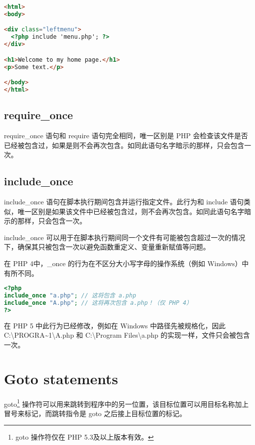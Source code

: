 \begin{lstlisting}[language=HTML]
<html>
<body>

<div class="leftmenu">
  <?php include 'menu.php'; ?>
</div>

<h1>Welcome to my home page.</h1>
<p>Some text.</p>

</body>
</html>
\end{lstlisting}


\subsection{require\_once}

require\_once 语句和 require 语句完全相同，唯一区别是 PHP 会检查该文件是否已经被包含过，如果是则不会再次包含。如同此语句名字暗示的那样，只会包含一次。

\subsection{include\_once}

include\_once 语句在脚本执行期间包含并运行指定文件。此行为和 include 语句类似，唯一区别是如果该文件中已经被包含过，则不会再次包含。如同此语句名字暗示的那样，只会包含一次。

include\_once 可以用于在脚本执行期间同一个文件有可能被包含超过一次的情况下，确保其只被包含一次以避免函数重定义、变量重新赋值等问题。

在 PHP 4中，\_once 的行为在不区分大小写字母的操作系统（例如 Windows）中有所不同。


\begin{lstlisting}[language=PHP]
<?php
include_once "a.php"; // 这将包含 a.php
include_once "A.php"; // 这将再次包含 a.php！（仅 PHP 4）
?>
\end{lstlisting}

在 PHP 5 中此行为已经修改，例如在 Windows 中路径先被规格化，因此 C:\textbackslash PROGRA\~{}1\textbackslash A.php 和 C:\textbackslash Program Files\textbackslash a.php 的实现一样，文件只会被包含一次。


\section{Goto statements}

goto\footnote{goto 操作符仅在 PHP 5.3及以上版本有效。} 操作符可以用来跳转到程序中的另一位置，该目标位置可以用目标名称加上冒号来标记，而跳转指令是 goto 之后接上目标位置的标记。



